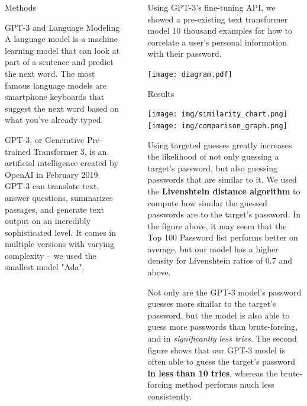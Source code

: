 \documentclass[final]{beamer}
\newlength{\sepwidth}
\newlength{\colwidth}
\newcommand{\separatorcolumn}{\begin{column}{\sepwidth}\end{column}}
\begin{document}
\begin{frame}[t]
\begin{columns}[t]
\begin{column}{\colwidth}
\begin{block}{Methods}
\begin{alertblock}{GPT-3 and Language Modeling}
     A language model is a machine learning model that can look at part of a sentence and predict the next word. The most famous language models are smartphone keyboards that suggest the next word based on what you've already typed.

    GPT-3, or Generative Pre-trained Transformer 3, is an artificial intelligence created by OpenAI in February 2019. GPT-3 can translate text, answer questions, summarizes passages, and generate text output on an incredibly sophisticated level. It comes in multiple versions with varying complexity – we used the smallest model "Ada".

  \end{alertblock}

  \end{block}

\end{column}

\separatorcolumn

\begin{column}{\colwidth}
      
    Using GPT-3's fine-tuning API, we showed a pre-existing text transformer model 10 thousand examples for how to correlate a user's personal information with their password.
    
    \texttt{[image: diagram.pdf]}
    

  \begin{block}{Results}
    \begin{center}
       \texttt{[image: img/similarity\_chart.png]}
       \hfill
       \texttt{[image: img/comparison\_graph.png]}
    \end{center} 
        
        Using targeted guesses greatly increases the likelihood of not only guessing a target's password, but also guessing passwords that are similar to it. We used the \textbf{Livenshtein distance algorithm} to compute how similar the guessed passwords  are to the target's password. In the figure above, it may seem that the Top 100 Password list performs better on average, but our model has a higher density for Livenshtein ratios of 0.7 and above.
        
        Not only are the GPT-3 model's password guesses more similar to the target's password, but the model is also able to guess more passwords than brute-forcing, and in \textit{significantly less tries}. The second figure shows that our GPT-3 model is often able to guess the target's password \textbf{in less than 10 tries}, whereas the brute-forcing method performs much less consistently.
        

\end{block}
\end{column}
\end{columns}
\end{frame}
\end{document}
